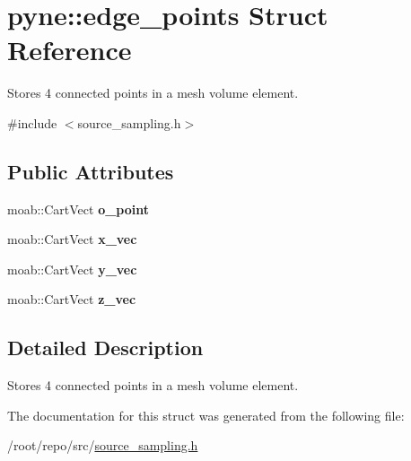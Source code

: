 \hypertarget{structpyne_1_1edge__points}{}\section{pyne\+:\+:edge\+\_\+points Struct Reference}
\label{structpyne_1_1edge__points}


Stores 4 connected points in a mesh volume element.  




{\ttfamily \#include $<$source\+\_\+sampling.\+h$>$}

\subsection*{Public Attributes}
\begin{DoxyCompactItemize}
\item 
\mbox{\label{structpyne_1_1edge__points_ada309b6576a990d7e911fb31ee450d64}} 
moab\+::\+Cart\+Vect {\bfseries o\+\_\+point}
\item 
\mbox{\label{structpyne_1_1edge__points_ace3786aead7c2cbce033bd48c84df18b}} 
moab\+::\+Cart\+Vect {\bfseries x\+\_\+vec}
\item 
\mbox{\label{structpyne_1_1edge__points_a5a7e7f46555011e67e5b55c0a8af20f1}} 
moab\+::\+Cart\+Vect {\bfseries y\+\_\+vec}
\item 
\mbox{\label{structpyne_1_1edge__points_a63554c3a4e3b789665d686dc9af79f85}} 
moab\+::\+Cart\+Vect {\bfseries z\+\_\+vec}
\end{DoxyCompactItemize}


\subsection{Detailed Description}
Stores 4 connected points in a mesh volume element. 

The documentation for this struct was generated from the following file\+:\begin{DoxyCompactItemize}
\item 
/root/repo/src/\hyperlink{source__sampling_8h}{source\+\_\+sampling.\+h}\end{DoxyCompactItemize}
